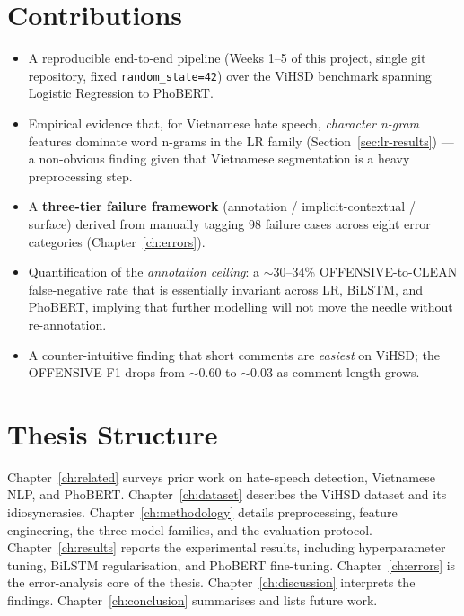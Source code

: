 \documentclass[a4paper,12pt,oneside]{report}
\begin{document}
\section{Contributions}
\begin{itemize}
  \item A reproducible end-to-end pipeline (Weeks 1--5 of this project,
        single git repository, fixed \texttt{random\_state=42}) over the
        ViHSD benchmark spanning Logistic Regression to PhoBERT.
  \item Empirical evidence that, for Vietnamese hate speech,
        \emph{character n-gram} features dominate word n-grams in the LR
        family (Section~\ref{sec:lr-results}) --- a non-obvious finding
        given that Vietnamese segmentation is a heavy preprocessing step.
  \item A \textbf{three-tier failure framework} (annotation /
        implicit-contextual / surface) derived from manually tagging 98
        failure cases across eight error categories
        (Chapter~\ref{ch:errors}).
  \item Quantification of the \emph{annotation ceiling}: a $\sim$30--34\%
        OFFENSIVE-to-CLEAN false-negative rate that is essentially
        invariant across LR, BiLSTM, and PhoBERT, implying that further
        modelling will not move the needle without re-annotation.
  \item A counter-intuitive finding that short comments are
        \emph{easiest} on ViHSD; the OFFENSIVE F1 drops from
        $\sim$0.60 to $\sim$0.03 as comment length grows.
\end{itemize}

\section{Thesis Structure}
Chapter~\ref{ch:related} surveys prior work on hate-speech detection,
Vietnamese NLP, and PhoBERT.
Chapter~\ref{ch:dataset} describes the ViHSD dataset and its idiosyncrasies.
Chapter~\ref{ch:methodology} details preprocessing, feature engineering,
the three model families, and the evaluation protocol.
Chapter~\ref{ch:results} reports the experimental results, including
hyperparameter tuning, BiLSTM regularisation, and PhoBERT fine-tuning.
Chapter~\ref{ch:errors} is the error-analysis core of the thesis.
Chapter~\ref{ch:discussion} interprets the findings.
Chapter~\ref{ch:conclusion} summarises and lists future work.


\end{document}
